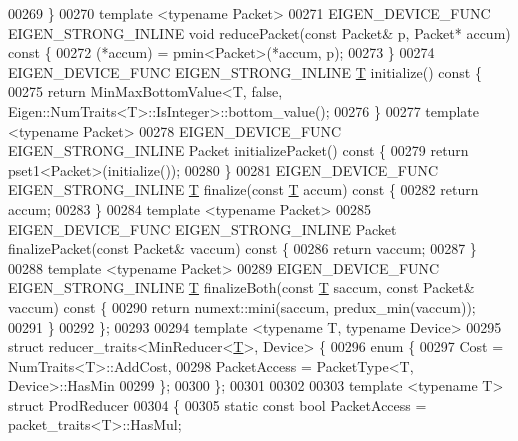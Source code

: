 \begin{DoxyCode}
00269   \}
00270   \textcolor{keyword}{template} <\textcolor{keyword}{typename} Packet>
00271   EIGEN\_DEVICE\_FUNC EIGEN\_STRONG\_INLINE \textcolor{keywordtype}{void} reducePacket(\textcolor{keyword}{const} Packet& p, Packet* accum)\textcolor{keyword}{ const }\{
00272     (*accum) = pmin<Packet>(*accum, p);
00273   \}
00274   EIGEN\_DEVICE\_FUNC EIGEN\_STRONG\_INLINE \hyperlink{group___sparse_core___module_class_eigen_1_1_triplet}{T} initialize()\textcolor{keyword}{ const }\{
00275     \textcolor{keywordflow}{return} MinMaxBottomValue<T, false, Eigen::NumTraits<T>::IsInteger>::bottom\_value();
00276   \}
00277   \textcolor{keyword}{template} <\textcolor{keyword}{typename} Packet>
00278   EIGEN\_DEVICE\_FUNC EIGEN\_STRONG\_INLINE Packet initializePacket()\textcolor{keyword}{ const }\{
00279     \textcolor{keywordflow}{return} pset1<Packet>(initialize());
00280   \}
00281   EIGEN\_DEVICE\_FUNC EIGEN\_STRONG\_INLINE \hyperlink{group___sparse_core___module_class_eigen_1_1_triplet}{T} finalize(\textcolor{keyword}{const} \hyperlink{group___sparse_core___module_class_eigen_1_1_triplet}{T} accum)\textcolor{keyword}{ const }\{
00282     \textcolor{keywordflow}{return} accum;
00283   \}
00284   \textcolor{keyword}{template} <\textcolor{keyword}{typename} Packet>
00285   EIGEN\_DEVICE\_FUNC EIGEN\_STRONG\_INLINE Packet finalizePacket(\textcolor{keyword}{const} Packet& vaccum)\textcolor{keyword}{ const }\{
00286     \textcolor{keywordflow}{return} vaccum;
00287   \}
00288   \textcolor{keyword}{template} <\textcolor{keyword}{typename} Packet>
00289   EIGEN\_DEVICE\_FUNC EIGEN\_STRONG\_INLINE \hyperlink{group___sparse_core___module_class_eigen_1_1_triplet}{T} finalizeBoth(\textcolor{keyword}{const} \hyperlink{group___sparse_core___module_class_eigen_1_1_triplet}{T} saccum, \textcolor{keyword}{const} Packet& vaccum)\textcolor{keyword}{ const }\{
00290     \textcolor{keywordflow}{return} numext::mini(saccum, predux\_min(vaccum));
00291   \}
00292 \};
00293 
00294 \textcolor{keyword}{template} <\textcolor{keyword}{typename} T, \textcolor{keyword}{typename} Device>
00295 \textcolor{keyword}{struct }reducer\_traits<MinReducer<\hyperlink{group___sparse_core___module_class_eigen_1_1_triplet}{T}>, Device> \{
00296   \textcolor{keyword}{enum} \{
00297     Cost = NumTraits<T>::AddCost,
00298     PacketAccess = PacketType<T, Device>::HasMin
00299   \};
00300 \};
00301 
00302 
00303 \textcolor{keyword}{template} <\textcolor{keyword}{typename} T> \textcolor{keyword}{struct }ProdReducer
00304 \{
00305   \textcolor{keyword}{static} \textcolor{keyword}{const} \textcolor{keywordtype}{bool} PacketAccess = packet\_traits<T>::HasMul;

\end{DoxyCode}
